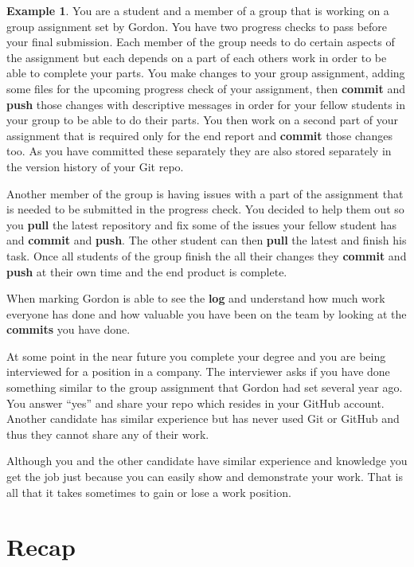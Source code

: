 \documentclass[
]{book}
\theoremstyle{definition}
\theoremstyle{definition}
\newtheorem{example}{Example}[chapter]
\theoremstyle{definition}
\theoremstyle{remark}
\begin{document}
\begin{example}
\protect\hypertarget{exm:unnamed-chunk-10}{}{\label{exm:unnamed-chunk-10} }You are a student and a member of a group that is working on a group assignment set by Gordon. You have two progress checks to pass before your final submission.
Each member of the group needs to do certain aspects of the assignment but each depends on a part of each others work in order to be able to complete your parts.
You make changes to your group assignment, adding some files for the upcoming progress check of your assignment, then \textbf{commit} and \textbf{push} those changes with descriptive messages in order for your fellow students in your group to be able to do their parts. You then work on a second part of your assignment that is required only for the end report and \textbf{commit} those changes too. As you have committed these separately they are also stored separately in the version history of your Git repo.

Another member of the group is having issues with a part of the assignment that is needed to be submitted in the progress check. You decided to help them out so you \textbf{pull} the latest repository and fix some of the issues your fellow student has and \textbf{commit} and \textbf{push}. The other student can then \textbf{pull} the latest and finish his task. Once all students of the group finish the
all their changes they \textbf{commit} and \textbf{push} at their own time and the end product is complete.

When marking Gordon is able to see the \textbf{log} and understand how much work everyone has done and how valuable you have been on the team by looking at the \textbf{commits} you have done.

At some point in the near future you complete your degree and you are being interviewed for a position in a company.
The interviewer asks if you have done something similar to the group assignment that Gordon had set several year ago. You answer ``yes'' and share your repo which resides in your GitHub account.
Another candidate has similar experience but has never used Git or GitHub and thus they cannot share any of their work.

Although you and the other candidate have similar experience and knowledge you get the job just because you can easily show and demonstrate your work. That is all that it takes sometimes to gain or lose a work position.
\end{example}

\hypertarget{recap}{%
\chapter{Recap}\label{recap}}
\end{document}
